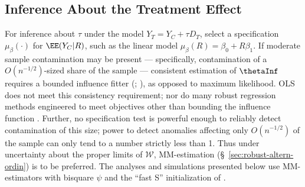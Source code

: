 

\subsection{Inference About the Treatment Effect}
\label{sec:test-hypoth-no}

For inference about $\tau$ under the model
$Y_{T} = Y_{C} + \tau D_{T}$, select a specification
$\mu_{\beta}(\cdot)$ for $\EE(Y_{C}| R)$, %
such as the
linear model $\mu_{\beta}(R) =\beta_{0} + R\beta_{1}$.
If moderate sample contamination may be present --- specifically, contamination of
a $O(n^{-1/2})$-sized
share of the sample --- consistent estimation of $\thetaInf$ requires a
bounded influence fitter (\citealp[Thm.~3]{he1991localbreakdown};
\citealp{yohaiZamar1997locallyrobustMestimates}), as opposed to
maximum likelihood.  OLS does not meet this consistency requirement;
nor do many robust regression methods engineered to meet
objectives other than bounding the influence function
\citep{stefanski1991note}.
Further, no specification test is powerful enough
to reliably detect contamination of this size; power to detect anomalies
affecting only $O(n^{-1/2})$ of the sample can only tend to a number
strictly less than 1.  %
Thus under uncertainty about the
proper limits of $\mathcal{W}$, MM-estimation (\S~\ref{sec:robust-altern-ordin}) is to be preferred.
The analyses and simulations presented below use MM-estimators with bisquare $\psi$ and
the ``fast S'' initialization of \citet{salibian-barreraYohai2006fastS}.


